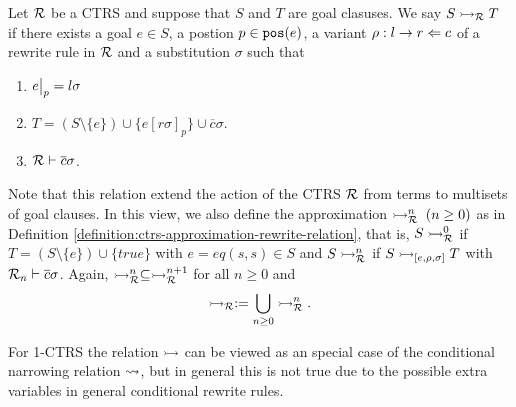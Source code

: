 \begin{definition}
    Let $\mathcal{R}$ be a CTRS and suppose that $S$ and $T$ are goal clasuses. We say $S \rightarrowtail_{\mathcal{R}} T$ if there exists a goal $e \in S$, a postion $p \in \mathtt{pos}(e)$, a variant $\rho : l \rightarrow r \Leftarrow c$ of a rewrite rule in $\mathcal{R}$ and a substitution $\sigma$ such that
    \begin{enumerate}
        \item $\restr{e}{p} = l \sigma$
        \item $T = (S \setminus \{e\}) \cup \{ e[r\sigma]_p \} \cup \overline{c} \sigma$.
        \item $\mathcal{R} \vdash \overline{c} \sigma$.
    \end{enumerate}
\end{definition}

Note that this relation extend the action of the CTRS $\mathcal{R}$ from terms to multisets of goal clauses. In this view, we also define the approximation $\rightarrowtail_{\mathcal{R}}^n \; (n \geq 0)$ as in Definition \ref{definition:ctrs-approximation-rewrite-relation}, that is, $S \rightarrowtail_{\mathcal{R}}^0$ if $T = (S \setminus \{e\}) \cup \{true\}$ with $e = eq(s,s) \in S$ and $S \rightarrowtail_{\mathcal{R}}^n$ if $S \rightarrowtail_{[e, \rho, \sigma]} T$ with $\mathcal{R}_n \vdash \overline{c} \sigma$. Again, $\rightarrowtail_{\mathcal{R}}^n \subseteq \rightarrowtail_{\mathcal{R}}^{n+1}$ for all $n \geq 0$ and
$$\rightarrowtail_{\mathcal{R}} := \bigcup\limits_{n \geq 0} \rightarrowtail_{\mathcal{R}}^n.$$

\begin{remark}
    For 1-CTRS the relation $\rightarrowtail$ can be viewed as an special case of the conditional narrowing relation $\mathbin{\rightsquigarrow}$, but in general this is not true due to the possible extra variables in general conditional rewrite rules.
\end{remark}
